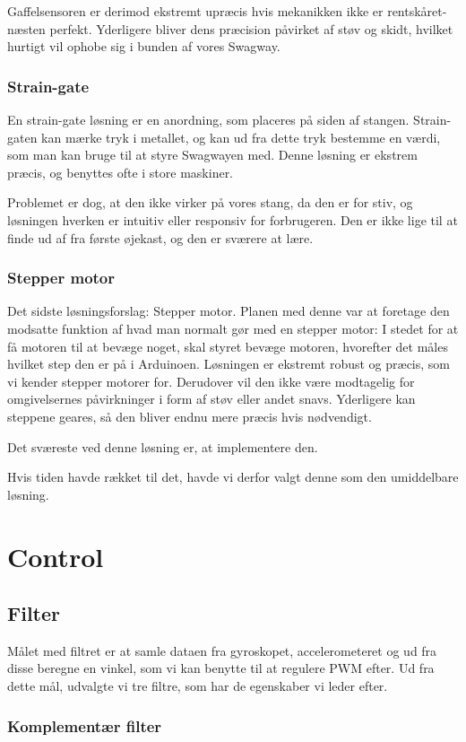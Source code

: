 \documentclass[a4paper,oneside,article,danish,table]{memoir}
\begin{document}
Gaffelsensoren er derimod ekstremt upræcis hvis mekanikken ikke er rentskåret-næsten perfekt. Yderligere bliver dens præcision påvirket af støv og skidt, hvilket hurtigt vil ophobe sig i bunden af vores Swagway.
\subsection{Strain-gate}
En strain-gate løsning er en anordning, som placeres på siden af stangen. Strain-gaten kan mærke tryk i metallet, og kan ud fra dette tryk bestemme en værdi, som man kan bruge til at styre Swagwayen med. Denne løsning er ekstrem præcis, og benyttes ofte i store maskiner.

Problemet er dog, at den ikke virker på vores stang, da den er for stiv, og løsningen hverken er intuitiv eller responsiv for forbrugeren. Den er ikke lige til at finde ud af fra første øjekast, og den er sværere at lære.
\subsection{Stepper motor}
Det sidste løsningsforslag: Stepper motor. Planen med denne var at foretage den modsatte funktion af hvad man normalt gør med en stepper motor: I stedet for at få motoren til at bevæge noget, skal styret bevæge motoren, hvorefter det måles hvilket step den er på i Arduinoen. Løsningen er ekstremt robust og præcis, som vi kender stepper motorer for. Derudover vil den ikke være modtagelig for omgivelsernes påvirkninger i form af støv eller andet snavs. Yderligere kan steppene geares, så den bliver endnu mere præcis hvis nødvendigt.

Det sværeste ved denne løsning er, at implementere den. 

Hvis tiden havde rækket til det, havde vi derfor valgt denne som den umiddelbare løsning.
\chapter{Control}
\section{Filter}\label{sec:filter}
Målet med filtret er at samle dataen fra gyroskopet, accelerometeret og ud fra disse beregne en vinkel, som vi kan benytte til at regulere PWM efter. Ud fra dette mål, udvalgte vi tre filtre, som har de egenskaber vi leder efter.
\subsection{Komplementær filter}
\end{document}

